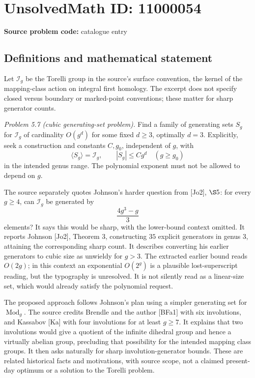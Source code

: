 \documentclass[11pt]{article}
\begin{document}
\section*{UnsolvedMath ID: 11000054}
\textbf{Source problem code:} catalogue entry
\subsection{Definitions and mathematical statement}
Let \(\mathcal I_g\) be the Torelli group in the source's surface convention, the kernel of the mapping-class action on integral first homology. The excerpt does not specify closed versus boundary or marked-point conventions; these matter for sharp generator counts.

\emph{Problem 5.7 (cubic generating-set problem).} Find a family of generating sets \(S_g\) for \(\mathcal I_g\) of cardinality \(O(g^d)\) for some fixed \(d\geq3\), optimally \(d=3\). Explicitly, seek a construction and constants \(C,g_0\), independent of \(g\), with
\[
 \langle S_g\rangle=\mathcal I_g,\qquad |S_g|\leq Cg^d
 \quad(g\geq g_0)
\]
in the intended genus range. The polynomial exponent must not be allowed to depend on \(g\).

The source separately quotes Johnson's harder question from [Jo2], \(\S5\): for every \(g\geq4\), can \(\mathcal I_g\) be generated by
\[
 \frac{4g^3-g}{3}
\]
elements? It says this would be sharp, with the lower-bound context omitted. It reports Johnson [Jo2], Theorem 3, constructing \(35\) explicit generators in genus \(3\), attaining the corresponding sharp count. It describes converting his earlier generators to cubic size as unwieldy for \(g>3\). The extracted earlier bound reads \(O(2g)\); in this context an exponential \(O(2^g)\) is a plausible lost-superscript reading, but the typography is unresolved. It is not silently read as a linear-size set, which would already satisfy the polynomial request.

The proposed approach follows Johnson's plan using a simpler generating set for \(\operatorname{Mod}_g\). The source credits Brendle and the author [BFa1] with six involutions, and Kassabov [Ka] with four involutions for at least \(g\geq7\). It explains that two involutions would give a quotient of the infinite dihedral group and hence a virtually abelian group, precluding that possibility for the intended mapping class groups. It then asks naturally for sharp involution-generator bounds. These are related historical facts and motivations, with source scope, not a claimed present-day optimum or a solution to the Torelli problem.
\end{document}
